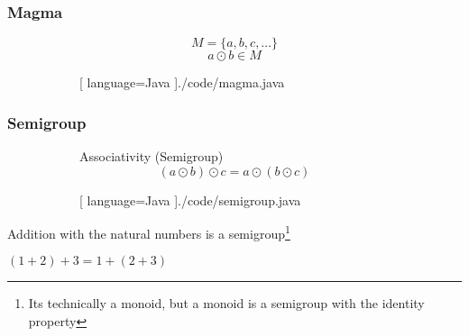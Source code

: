 \begin{frame}
  \frametitle{Magma}
  \begin{figure}[H]
    \begin{subfigure}[h]{0.45\textwidth}
      \begin{equation}
        M = \{ a, b, c, \dots \}
      \end{equation}
      \begin{equation}
        a \odot b \in M
      \end{equation}
    \end{subfigure}
    \hfill
    \begin{subfigure}[h]{0.45\textwidth}
      \begin{center}
      
      [ language=Java
      ]{./code/magma.java}
  \end{center}
    \end{subfigure}
  \end{figure}
\end{frame}

\hidelogo

\begin{frame}
  \frametitle{Semigroup}
  \begin{figure}[H]
    \begin{subfigure}[h]{0.45\textwidth}
      Associativity (Semigroup)
      \begin{equation}
        (a \odot b) \odot c = a \odot (b \odot c)
      \end{equation}
    \end{subfigure}
    \hfill
    \begin{subfigure}[h]{0.45\textwidth}
      \begin{center}
        
        [ language=Java
        ]{./code/semigroup.java}
      \end{center}
    \end{subfigure}
  \end{figure}
  Addition with the natural numbers is a semigroup\footnote{Its technically a monoid, but a monoid is a semigroup with the identity property}
      \begin{center}
        $(1 + 2) + 3 = 1 + (2 + 3)$
      \end{center}
\end{frame}

